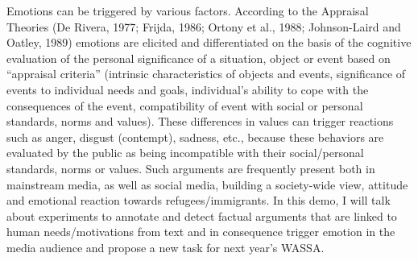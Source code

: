 Emotions can be triggered by various factors. According to the Appraisal Theories (De Rivera, 1977; Frijda, 1986; Ortony et al., 1988; Johnson-Laird and Oatley, 1989) emotions are elicited and differentiated on the basis of the cognitive evaluation of the personal significance of a situation, object or event based on ``appraisal criteria'' (intrinsic characteristics of objects and events, significance of events to individual needs and goals, individual's ability to cope with the consequences of the event, compatibility of event with social or personal standards, norms and values). These differences in values can trigger reactions such as anger, disgust (contempt), sadness, etc., because these behaviors are evaluated by the public as being incompatible with their social/personal standards, norms or values. Such arguments are frequently present both in mainstream media, as well as social media, building a society-wide view, attitude and emotional reaction towards refugees/immigrants. In this demo, I will talk about experiments to annotate and detect factual arguments that are linked to human needs/motivations from text and in consequence trigger emotion in the media audience and propose a new task for next year's WASSA.
